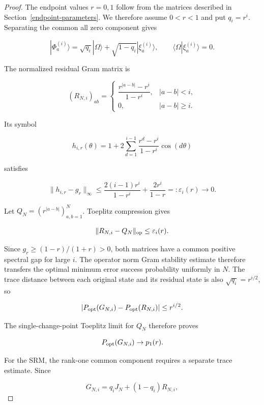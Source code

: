 \begin{proof}
The endpoint values \(r=0,1\) follow from the matrices described in
Section~\ref{endpoint-parameters}. We therefore assume \(0<r<1\) and put
\(q_i=r^i\). Separating the common all zero component gives

\[
|\Phi_a^{(i)}\rangle
=\sqrt{q_i}|\Omega\rangle
+\sqrt{1-q_i}|\xi_a^{(i)}\rangle,
\qquad \langle\Omega|\xi_a^{(i)}\rangle=0.
\]

The normalized residual Gram matrix is

\begin{equation}\label{eq:residual-gram}
(R_{N,i})_{ab}=
\begin{cases}
\dfrac{r^{|a-b|}-r^i}{1-r^i},&|a-b|<i,\\
0,&|a-b|\ge i.
\end{cases}
\end{equation}

Its symbol

\[
h_{i,r}(\theta)
=1+2\sum_{d=1}^{i-1}\frac{r^d-r^i}{1-r^i}\cos(d\theta)
\]

satisfies

\begin{equation}\label{eq:residual-symbol-convergence}
\|h_{i,r}-g_r\|_\infty
\le\frac{2(i-1)r^i}{1-r^i}+\frac{2r^i}{1-r}
=:\varepsilon_i(r)\longrightarrow0.
\end{equation}

Let \(Q_N=(r^{|a-b|})_{a,b=1}^N\). Toeplitz compression gives

\begin{equation}\label{eq:residual-operator-convergence}
\|R_{N,i}-Q_N\|_{\rm op}\le\varepsilon_i(r).
\end{equation}

Since \(g_r\ge(1-r)/(1+r)>0\), both matrices have a common positive
spectral gap for large \(i\). The operator norm Gram stability estimate therefore
transfers the optimal minimum error success probability uniformly in \(N\).
The trace distance
between each original state and its residual state is also
\(\sqrt{q_i}=r^{i/2}\), so

\[
|P_{\rm opt}(G_{N,i})-P_{\rm opt}(R_{N,i})|
\le r^{i/2}.
\]

The single-change-point Toeplitz limit for \(Q_N\) therefore proves

\[
P_{\rm opt}(G_{N,i})\to p_1(r).
\]

For the SRM, the rank-one common component requires a separate trace estimate.
Since

\[
G_{N,i}=q_iJ_N+(1-q_i)R_{N,i},
\]


\end{proof}
